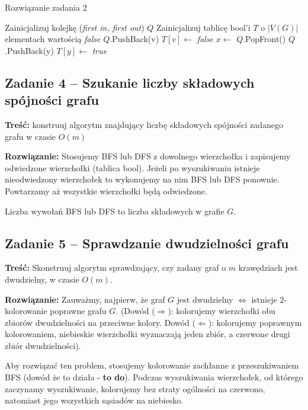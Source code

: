\begin{algorithm}[H]
	\caption{Rozwiązanie zadania 2}\label{Zadanie23}
	\begin{algorithmic}[1]
		\State Zainicjalizuj kolejkę (\textit{first in, first out}) $Q$
		\State Zainicjalizuj tablicę bool'i $T$ o $|V(G)|$ elementach wartością 
		\textit{false}
		\State $Q$.PushBack(v)
		\State $T[v] \gets$ \textit{false}
		\State $x \gets$ $Q$.PopFront()
		\State $Q$.PushBack(y)
		\State $T[y] \gets$ \textit{true} 
		\EndIf
		\EndWhile
		\EndWhile
		\EndProcedure
	\end{algorithmic}
\end{algorithm}

\subsection{Zadanie 4 -- Szukanie liczby składowych spójności grafu}
\textbf{Treść: } konstruuj algorytm znajdujący liczbę składowych 
spójności zadanego grafu w czasie $O(m)$

\textbf{Rozwiązanie: } Stosujemy BFS lub DFS z dowolnego 
wierzchołka i zapisujemy odwiedzone wierzchołki (tablica bool).
Jeżeli po wyszukiwaniu istnieje nieodwiedzony wierzchołek to 
wykonujemy na nim BFS lub DFS ponownie. Powtarzamy aż
wszystkie wierzchołki będą odwiedzone. 

Liczba wywołań BFS lub DFS to liczba składowych w grafie $G$.

\subsection{Zadanie 5 -- Sprawdzanie dwudzielności grafu}
\label{exc:bipart}
\textbf{Treść: } Skonstruuj algorytm sprawdzający, 
czy zadany graf o $m$ krawędziach jest dwudzielny, w czasie $O(m)$.

\textbf{Rozwiązanie: } Zauważmy, najpierw, że 
graf $G$ jest dwudzielny $\Leftrightarrow$ istnieje $2$-kolorowanie
poprawne grafu $G$. (Dowód ($\Rightarrow$): kolorujemy 
wierzchołki obu zbiorów dwudzielności na przeciwne kolory. Dowód 
($\Leftarrow$): kolorujemy poprawnym kolorowaniem, niebieskie
wierzchołki wyznaczają jeden zbiór, a czerwone drugi zbiór dwudzielności). 

Aby rozwiązać ten problem, stosujemy kolorowanie 
zachłanne z przeszukiwaniem BFS (dowód że to działa -\textbf{ to do}). 
Podczas wyszukiwania wierzchołek, od którego zaczynamy 
wyszukiwanie, kolorujemy 
bez straty ogólności na czerwono, natomiast jego
wszystkich sąsiadów na niebiesko.

